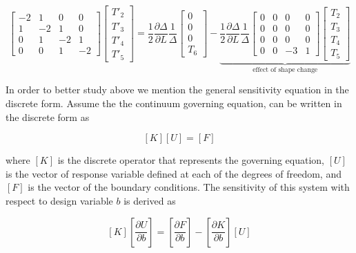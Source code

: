 \begin{equation}\label{eq:C2_laplaceEquationMatrixFormSensitivity}
	\begin{bmatrix}
		-2 & 1 & 0 & 0 \\
		1 & -2 & 1 & 0 \\
		0 & 1 & -2 & 1 \\
		0 & 0 & 1 & -2
	\end{bmatrix}
	\begin{bmatrix}
		T'_2 \\
		T'_3 \\
		T'_4 \\
		T'_5
	\end{bmatrix}
	=
	\frac{1}{2} \frac{\partial \Delta}{\partial L} \frac{1}{\Delta}
	\begin{bmatrix}
		0 \\
		0 \\
		0 \\
		T_6
	\end{bmatrix}
	-
	\underbrace{
	\frac{1}{2} \frac{\partial \Delta}{\partial L} \frac{1}{\Delta}
	\begin{bmatrix}
		0 & 0 & 0 & 0 \\
		0 & 0 & 0 & 0 \\
		0 & 0 & 0 & 0 \\
		0 & 0 & -3 & 1
	\end{bmatrix}
	\begin{bmatrix}
		T_2 \\
		T_3 \\
		T_4 \\
		T_5
	\end{bmatrix}}_\text{effect of shape change}
\end{equation}

In order to better study above we mention the general sensitivity equation in the discrete form. Assume the the continuum governing equation, can be written in the discrete form as

\begin{equation*}
	\left[ K \right] \left[ U \right] = \left[ F \right]
\end{equation*}

where $[K]$ is the discrete operator that represents the governing equation, $[U]$ is the vector of response variable defined at each of the degrees of freedom, and $[F]$ is the vector of the boundary conditions. The sensitivity of this system with respect to design variable $b$ is derived as

\begin{equation*}
	\left[ K \right] \left[ \frac{\partial U}{\partial b} \right] = 
	\left[ \frac{\partial F}{\partial b} \right] - 
		\left[ \frac{\partial K}{\partial b} \right] \left[ U \right]
\end{equation*}

